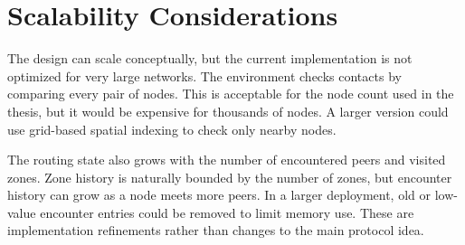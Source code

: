 \section{Scalability Considerations}
The design can scale conceptually, but the current implementation is not optimized for very large networks. The environment checks contacts by comparing every pair of nodes. This is acceptable for the node count used in the thesis, but it would be expensive for thousands of nodes. A larger version could use grid-based spatial indexing to check only nearby nodes.

The routing state also grows with the number of encountered peers and visited zones. Zone history is naturally bounded by the number of zones, but encounter history can grow as a node meets more peers. In a larger deployment, old or low-value encounter entries could be removed to limit memory use. These are implementation refinements rather than changes to the main protocol idea.
